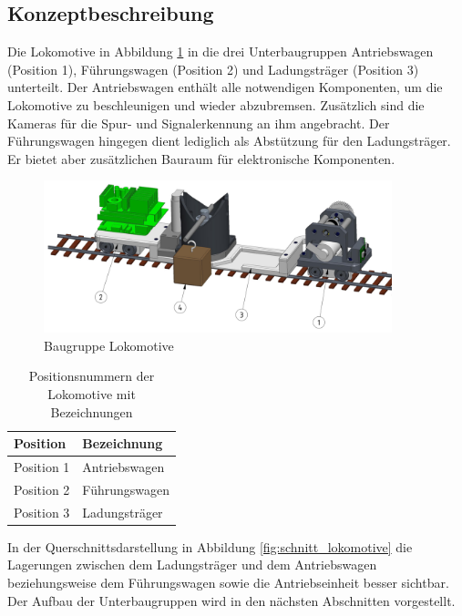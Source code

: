 \documentclass[../../main.tex]{subfiles}
\begin{document}
    \subsection{Konzeptbeschreibung}
    Die Lokomotive in Abbildung \ref{fig:bg_lokomotive} in die drei Unterbaugruppen Antriebswagen (Position 1), Führungswagen (Position 2) und Ladungsträger (Position 3) unterteilt. Der Antriebswagen enthält alle notwendigen Komponenten, um die Lokomotive zu beschleunigen und wieder abzubremsen. Zusätzlich sind die Kameras für die Spur- und Signalerkennung an ihm angebracht. Der Führungswagen hingegen dient lediglich als Abstützung für den Ladungsträger. Er bietet aber zusätzlichen Bauraum für elektronische Komponenten.\\

    \begin{figure}[H] %
        \centering
        \includegraphics[width=0.9\textwidth]{Lokomotive.png}
        \caption{Baugruppe Lokomotive}
        \label{fig:bg_lokomotive}
    \end{figure}

    \begin{table}[H] \centering
        \begin{tabular}{|l|l|}
        \hline
        \textbf{Position} & \textbf{Bezeichnung}\\
        \hline
        Position 1          & Antriebswagen\\
         \hline
        Position 2          & Führungswagen\\
        \hline
        Position 3          & Ladungsträger\\
        \hline
        \end{tabular}
        
        \caption{Positionsnummern der Lokomotive mit Bezeichnungen}
        \label{tab:com_tiny_pi}
        \end{table}
    
    In der Querschnittsdarstellung in Abbildung \ref{fig:schnitt_lokomotive} die Lagerungen zwischen dem Ladungsträger und dem Antriebswagen beziehungsweise dem Führungswagen sowie die Antriebseinheit besser sichtbar. Der Aufbau der Unterbaugruppen wird in den nächsten Abschnitten vorgestellt.
   
\end{document}
